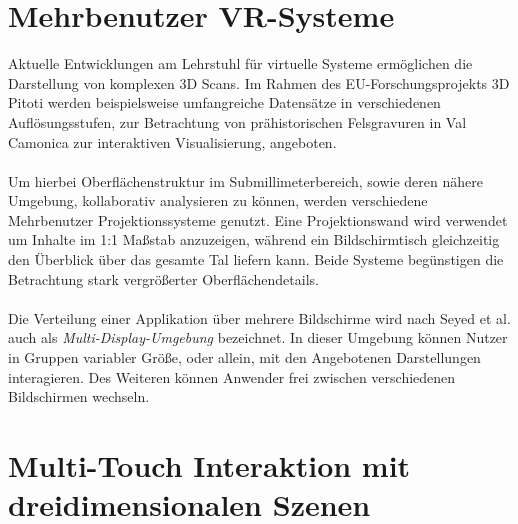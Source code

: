 \section{Mehrbenutzer VR-Systeme}
\label{sec:mehrbenutzer_vr_systeme}

Aktuelle Entwicklungen am Lehrstuhl für virtuelle Systeme ermöglichen die Darstellung von komplexen 3D Scans. Im Rahmen des EU-Forschungsprojekts 3D Pitoti werden beispielsweise umfangreiche Datensätze in verschiedenen Auflösungsstufen, zur Betrachtung von prähistorischen Felsgravuren in Val Camonica zur interaktiven Visualisierung, angeboten. 
\\\\
Um hierbei Oberflächenstruktur im Submillimeterbereich, sowie deren nähere Umgebung, kollaborativ analysieren zu können, werden verschiedene Mehrbenutzer Projektionssysteme genutzt. Eine Projektionswand wird verwendet um Inhalte im 1:1 Maßstab anzuzeigen, während ein Bildschirmtisch gleichzeitig den Überblick über das gesamte Tal liefern kann. Beide Systeme begünstigen die Betrachtung stark vergrößerter Oberflächendetails.
\\\\
Die Verteilung einer Applikation über mehrere Bildschirme wird nach Seyed et al. \cite{seyed:2013} auch als \emph{Multi-Display-Umgebung} bezeichnet. In dieser Umgebung können Nutzer in Gruppen variabler Größe, oder allein, mit den Angebotenen Darstellungen interagieren. Des Weiteren können Anwender frei zwischen verschiedenen Bildschirmen wechseln.


\section{Multi-Touch Interaktion mit dreidimensionalen Szenen}
\label{sec:multi_touch_interaktion_mit_3d_szenen}

